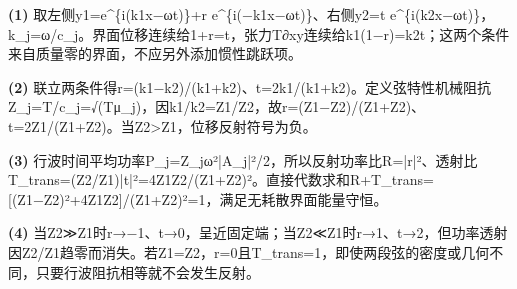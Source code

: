 \par\noindent\textbf{(1)} 取左侧y1=e\textasciicircum{}\{i(k1x−ωt)\}+r e\textasciicircum{}\{i(−k1x−ωt)\}、右侧y2=t e\textasciicircum{}\{i(k2x−ωt)\}，k\_j=ω/c\_j。界面位移连续给1+r=t，张力T∂xy连续给k1(1−r)=k2t；这两个条件来自质量零的界面，不应另外添加惯性跳跃项。
\par\noindent\textbf{(2)} 联立两条件得r=(k1−k2)/(k1+k2)、t=2k1/(k1+k2)。定义弦特性机械阻抗Z\_j=T/c\_j=√(Tμ\_j)，因k1/k2=Z1/Z2，故r=(Z1−Z2)/(Z1+Z2)、t=2Z1/(Z1+Z2)。当Z2>Z1，位移反射符号为负。
\par\noindent\textbf{(3)} 行波时间平均功率P\_j=Z\_jω²|A\_j|²/2，所以反射功率比R=|r|²、透射比T\_trans=(Z2/Z1)|t|²=4Z1Z2/(Z1+Z2)²。直接代数求和R+T\_trans=[(Z1−Z2)²+4Z1Z2]/(Z1+Z2)²=1，满足无耗散界面能量守恒。
\par\noindent\textbf{(4)} 当Z2≫Z1时r→−1、t→0，呈近固定端；当Z2≪Z1时r→1、t→2，但功率透射因Z2/Z1趋零而消失。若Z1=Z2，r=0且T\_trans=1，即使两段弦的密度或几何不同，只要行波阻抗相等就不会发生反射。
